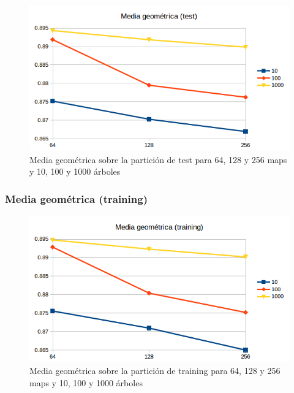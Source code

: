 \begin{figure}[H]
	\centering
	\includegraphics[width=12cm]{img/media-geometrica-test}
	\caption{Media geométrica sobre la partición de test para 64, 128 y 256 maps y 10, 100 y 1000 árboles}
	\label{fig:media-geometrica-test}
\end{figure}

\subsubsection{Media geométrica (training)}

\begin{figure}[H]
	\centering
	\includegraphics[width=12cm]{img/media-geometrica-training}
	\caption{Media geométrica sobre la partición de training para 64, 128 y 256 maps y 10, 100 y 1000 árboles}
	\label{fig:media-geometrica-training}
\end{figure}




